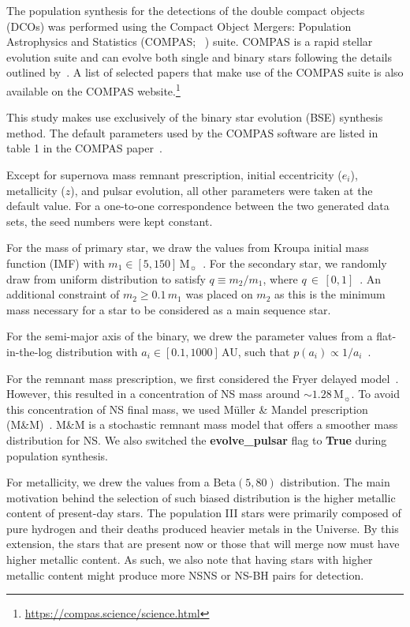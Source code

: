 The population synthesis for the detections of the double compact objects (DCOs) was performed using the Compact
Object Mergers: Population Astrophysics and Statistics (COMPAS; ~\cite{stevenson2017formation, Riley2022,
    Vigna2018}) suite.
COMPAS is a rapid stellar evolution suite and can evolve both single and binary stars following the details outlined
by~\cite{Hurley2000, Hurley2002}.
A list of selected papers that make use of the COMPAS suite is also available on the COMPAS website.\footnote{\url{https://compas.science/science.html}}

This study makes use exclusively of the binary star evolution (BSE) synthesis method.
The default parameters used by the COMPAS software are listed in table 1 in the COMPAS paper~\cite{Riley2022}.

Except for supernova mass remnant prescription, initial eccentricity ($e_i$), metallicity ($z$), and pulsar evolution, all other parameters were taken at the default value.
For a one-to-one correspondence between the two generated data sets, the seed numbers were kept constant.

For the mass of primary star, we draw the values from Kroupa initial mass function (IMF) with $m_1 \in [5, 150]\,\text{M}_\sun$~\cite{kroupa2001variation}.
For the secondary star, we randomly draw from uniform distribution to satisfy $q\equiv m_2/m_1$, where $q\,\in\,[0, 1]$~\cite{sana2012binary}.
An additional constraint of $m_2 \geq 0.1\,m_1$ was placed on $m_2$ as this is the minimum mass necessary for a star to be considered as a main sequence star.

For the semi-major axis of the binary, we drew the parameter values from a flat-in-the-log distribution with $a_i \in [0.1, 1000]\,$AU, such that
$p(a_i) \propto 1/a_i$~\cite{opik1924photographic}.

For the remnant mass prescription, we first considered the Fryer delayed model~\cite{Fryer2012}.
However, this resulted in a concentration of NS mass around $\sim1.28\,\text{M}_\sun$.
To avoid this concentration of NS final mass, we used Müller \& Mandel prescription (M\&M)~\cite{Mandel2020}.
M\&M is a stochastic remnant mass model that offers a smoother mass distribution for NS\@.
We also switched the \textbf{evolve\_pulsar} flag to \textbf{True} during population synthesis.

For metallicity, we drew the values from a $\text{Beta}(5, 80)$ distribution.
The main motivation behind the selection of such biased distribution is the higher metallic content of present-day stars.
The population III stars were primarily composed of pure hydrogen and their deaths produced heavier metals in the Universe.
By this extension, the stars that are present now or those that will merge now must have higher metallic content.
As such, we also note that having stars with higher metallic content might produce more NSNS or NS-BH pairs for detection.

